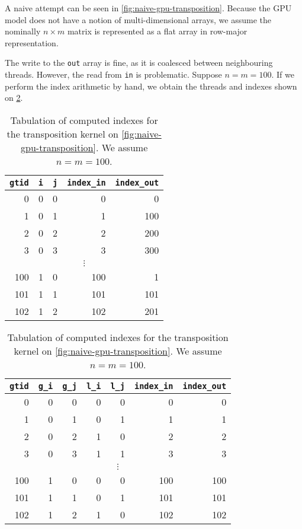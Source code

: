 A naive attempt can be seen in \cref{fig:naive-gpu-transposition}.
Because the GPU model does not have a notion of multi-dimensional
arrays, we assume the nominally $n\times{}m$ matrix is represented as
a flat array in row-major representation.

The write to the \texttt{out} array is fine, as it is coalesced
between neighbouring threads.  However, the read from \texttt{in} is
problematic.  Suppose $n=m=100$.  If we perform the index arithmetic
by hand, we obtain the threads and indexes shown on
\cref{tab:naive-gpu-indices}.

\begin{table}

  \begin{subtable}{\textwidth}
  \centering
\begin{tabular}{r|rr|rr}
  \texttt{gtid} & \texttt{i} & \texttt{j} & \texttt{index\_in} & \texttt{index\_out} \\\hline
  0 & 0 & 0 & 0 & 0 \\
  1 & 0 & 1 & 1 & 100 \\
  2 & 0 & 2 & 2 & 200 \\
  3 & 0 & 3 & 3 & 300 \\
  \multicolumn{5}{c}{$\vdots$} \\
  100 & 1 & 0 & 100 & 1 \\
  101 & 1 & 1 & 101 & 101 \\
  102 & 1 & 2 & 102 & 201 \\
\end{tabular}

  \caption{Tabulation of computed indexes for the transposition kernel on \cref{fig:naive-gpu-transposition}.  We assume $n=m=100$.}
  \label{tab:naive-gpu-indices}
  \end{subtable}

  \begin{subtable}{\textwidth}
  \centering
\begin{tabular}{r|rr|rr|rr}
  \texttt{gtid} & \texttt{g\_i} & \texttt{g\_j} & \texttt{l\_i} & \texttt{l\_j} & \texttt{index\_in} & \texttt{index\_out} \\\hline
  0 & 0 & 0 & 0 & 0 &  0 & 0 \\
  1 & 0 & 1 & 0 & 1 &  1 & 1 \\
  2 & 0 & 2 & 1 & 0 &  2 & 2 \\
  3 & 0 & 3 & 1 & 1 &  3 & 3 \\
  \multicolumn{7}{c}{$\vdots$} \\
  100 & 1 & 0 & 0 & 0 & 100 & 100 \\
  101 & 1 & 1 & 0 & 1 & 101 & 101 \\
  102 & 1 & 2 & 1 & 0 & 102 & 102 \\
\end{tabular}


\end{subtable}
\end{table}
